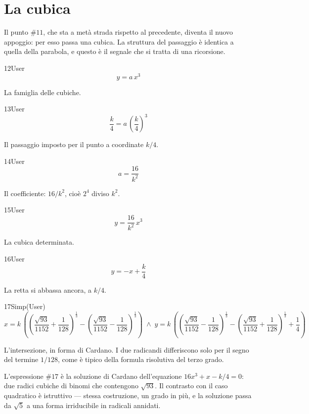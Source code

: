 \section{La cubica}

Il punto $\#11$, che sta a metà strada rispetto al precedente, diventa il nuovo appoggio: per esso passa una cubica. La struttura del passaggio è identica a quella della parabola, e questo è il segnale che si tratta di una ricorsione.

\begin{espr}{12}{User}{}
\[
y = a\, x^{3}
\]
\end{espr}
La famiglia delle cubiche.

\begin{espr}{13}{User}{}
\[
\frac{k}{4} = a\, \left(\frac{k}{4}\right)^{3}
\]
\end{espr}
Il passaggio imposto per il punto a coordinate $k/4$.

\begin{espr}{14}{User}{}
\[
a = \frac{16}{k^{2}}
\]
\end{espr}
Il coefficiente: $16/k^2$, cioè $2^4$ diviso $k^2$.

\begin{espr}{15}{User}{}
\[
y = \frac{16}{k^{2}}\, x^{3}
\]
\end{espr}
La cubica determinata.

\begin{espr}{16}{User}{}
\[
y = -x + \frac{k}{4}
\]
\end{espr}
La retta si abbassa ancora, a $k/4$.

\begin{espr}{17}{Simp(User)}{}
\[
x = k\, \left(\left(\frac{\sqrt{93}}{1152} + \frac{1}{128}\right)^{\frac{1}{3}} - \left(\frac{\sqrt{93}}{1152} - \frac{1}{128}\right)^{\frac{1}{3}}\right) \;\land\; y = k\, \left(\left(\frac{\sqrt{93}}{1152} - \frac{1}{128}\right)^{\frac{1}{3}} - \left(\frac{\sqrt{93}}{1152} + \frac{1}{128}\right)^{\frac{1}{3}} + \frac{1}{4}\right)
\]
\end{espr}
L'intersezione, in forma di Cardano. I due radicandi differiscono solo per il segno del termine $1/128$, come è tipico della formula risolutiva del terzo grado.


L'espressione $\#17$ è la soluzione di Cardano dell'equazione $16x^3+x-k/4=0$: due radici cubiche di binomi che contengono $\sqrt{93}$. Il contrasto con il caso quadratico è istruttivo — stessa costruzione, un grado in più, e la soluzione passa da $\sqrt5$ a una forma irriducibile in radicali annidati.

